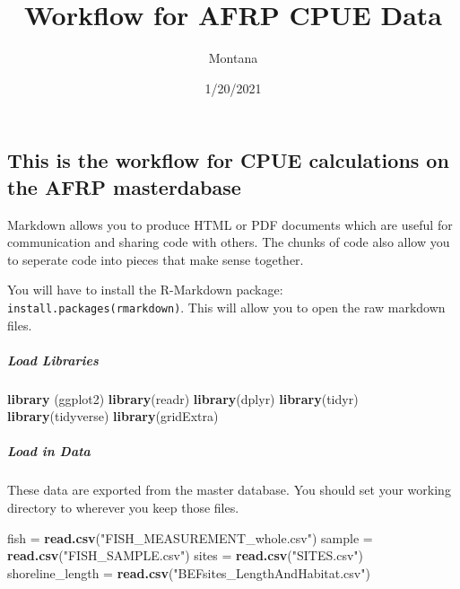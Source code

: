 \documentclass[
]{article}
\title{Workflow for AFRP CPUE Data}
\author{Montana}
\date{1/20/2021}
\newenvironment{Shaded}{\begin{snugshade}}{\end{snugshade}}
\newcommand{\KeywordTok}[1]{\textcolor[rgb]{0.13,0.29,0.53}{\textbf{#1}}}
\newcommand{\NormalTok}[1]{#1}
\newcommand{\StringTok}[1]{\textcolor[rgb]{0.31,0.60,0.02}{#1}}
\begin{document}
\maketitle

\hypertarget{this-is-the-workflow-for-cpue-calculations-on-the-afrp-masterdabase}{%
\subsection{This is the workflow for CPUE calculations on the AFRP
masterdabase}\label{this-is-the-workflow-for-cpue-calculations-on-the-afrp-masterdabase}}

Markdown allows you to produce HTML or PDF documents which are useful
for communication and sharing code with others. The chunks of code also
allow you to seperate code into pieces that make sense together.

You will have to install the R-Markdown package:
\texttt{install.packages(\textquotesingle{}rmarkdown\textquotesingle{})}.
This will allow you to open the raw markdown files.

\hypertarget{load-libraries}{%
\subparagraph{Load Libraries}\label{load-libraries}}

\begin{Shaded}
\begin{Highlighting}[]
\KeywordTok{library}\NormalTok{ (ggplot2)}
\KeywordTok{library}\NormalTok{(readr)}
\KeywordTok{library}\NormalTok{(dplyr)}
\KeywordTok{library}\NormalTok{(tidyr)}
\KeywordTok{library}\NormalTok{(tidyverse)}
\KeywordTok{library}\NormalTok{(gridExtra)}
\end{Highlighting}
\end{Shaded}

\hypertarget{load-in-data}{%
\subparagraph{Load in Data}\label{load-in-data}}

These data are exported from the master database. You should set your
working directory to wherever you keep those files.

\begin{Shaded}
\begin{Highlighting}[]
\NormalTok{fish =}\StringTok{ }\KeywordTok{read.csv}\NormalTok{(}\StringTok{"FISH_MEASUREMENT_whole.csv"}\NormalTok{)}
\NormalTok{sample =}\StringTok{ }\KeywordTok{read.csv}\NormalTok{(}\StringTok{"FISH_SAMPLE.csv"}\NormalTok{)}
\NormalTok{sites =}\StringTok{ }\KeywordTok{read.csv}\NormalTok{(}\StringTok{"SITES.csv"}\NormalTok{)}
\NormalTok{shoreline_length =}\StringTok{ }\KeywordTok{read.csv}\NormalTok{(}\StringTok{"BEFsites_LengthAndHabitat.csv"}\NormalTok{)}
\end{Highlighting}
\end{Shaded}
\end{document}
